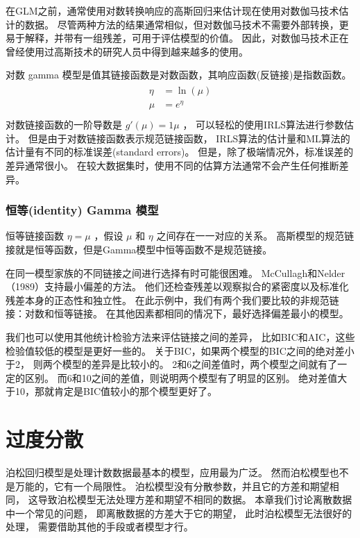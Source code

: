 \documentclass[letterpaper,10pt,english]{sphinxmanual}
\begin{document}
在GLM之前，通常使用对数转换响应的高斯回归来估计现在使用对数伽马技术估计的数据。
尽管两种方法的结果通常相似，但对数伽马技术不需要外部转换，更易于解释，并带有一组残差，可用于评估模型的价值。
因此，对数伽马技术正在曾经使用过高斯技术的研究人员中得到越来越多的使用。

对数 gamma 模型是值其链接函数是对数函数，其响应函数(反链接)是指数函数。
\begin{align}\label{equation:gamma模型/content:gamma模型/content:18}\!\begin{aligned}
\eta &= \ln (\mu)\\
\mu &= e^{\eta}\\
\end{aligned}\end{align}
对数链接函数的一阶导数是 \(g'(\mu)=1\mu\) ，
可以轻松的使用IRLS算法进行参数估计。
但是由于对数链接函数表示规范链接函数，
IRLS算法的估计量和ML算法的估计量有不同的标准误差(standard errors)。
但是，除了极端情况外，标准误差的差异通常很小。
在较大数据集时，使用不同的估算方法通常不会产生任何推断差异。


\subsection{恒等(identity) Gamma 模型}
\label{\detokenize{gamma_u6a21_u578b/content:identity-gamma}}
恒等链接函数 \(\eta=\mu\) ，假设 \(\mu\) 和 \(\eta\) 之间存在一一对应的关系。
高斯模型的规范链接就是恒等函数，但是Gamma模型中恒等函数不是规范链接。

在同一模型家族的不同链接之间进行选择有时可能很困难。
McCullagh和Nelder（1989）支持最小偏差的方法。
他们还检查残差以观察拟合的紧密度以及标准化残差本身的正态性和独立性。
在此示例中，我们有两个我们要比较的非规范链接：对数和恒等链接。
在其他因素都相同的情况下，最好选择偏差最小的模型。

我们也可以使用其他统计检验方法来评估链接之间的差异，
比如BIC和AIC，这些检验值较低的模型是更好一些的。
关于BIC，如果两个模型的BIC之间的绝对差小于2，
则两个模型的差异是比较小的。
2和6之间差值时，两个模型之间就有了一定的区别。
而6和10之间的差值，则说明两个模型有了明显的区别。
绝对差值大于10，那就肯定是BIC值较小的那个模型更好了。


\chapter{过度分散}
\label{\detokenize{_u8fc7_u5ea6_u5206_u6563/content:id1}}\label{\detokenize{_u8fc7_u5ea6_u5206_u6563/content::doc}}
泊松回归模型是处理计数数据最基本的模型，应用最为广泛。
然而泊松模型也不是万能的，它有一个局限性。
泊松模型没有分散参数，并且它的方差和期望相同，
这导致泊松模型无法处理方差和期望不相同的数据。
本章我们讨论离散数据中一个常见的问题，
即离散数据的方差大于它的期望，
此时泊松模型无法很好的处理，
需要借助其他的手段或者模型才行。
\end{document}
